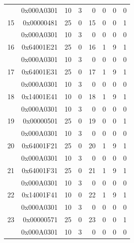 \begin{longtable}{r r r r r r r r}
  & 0x000A0301 & 10 & 3 & 0 & 0 & 0 & 0 \\
15 & 0x00000481 & 25 & 0 & 15 & 0 & 0 & 1 \\
  & 0x000A0301 & 10 & 3 & 0 & 0 & 0 & 0 \\
16 & 0x64001E21 & 25 & 0 & 16 & 1 & 9 & 1 \\
  & 0x000A0301 & 10 & 3 & 0 & 0 & 0 & 0 \\
17 & 0x64001E31 & 25 & 0 & 17 & 1 & 9 & 1 \\
  & 0x000A0301 & 10 & 3 & 0 & 0 & 0 & 0 \\
18 & 0x14001E41 & 10 & 0 & 18 & 1 & 9 & 1 \\
  & 0x000A0301 & 10 & 3 & 0 & 0 & 0 & 0 \\
19 & 0x00000501 & 25 & 0 & 19 & 0 & 0 & 1 \\
  & 0x000A0301 & 10 & 3 & 0 & 0 & 0 & 0 \\
20 & 0x64001F21 & 25 & 0 & 20 & 1 & 9 & 1 \\
  & 0x000A0301 & 10 & 3 & 0 & 0 & 0 & 0 \\
21 & 0x64001F31 & 25 & 0 & 21 & 1 & 9 & 1 \\
  & 0x000A0301 & 10 & 3 & 0 & 0 & 0 & 0 \\
22 & 0x14001F41 & 10 & 0 & 22 & 1 & 9 & 1 \\
  & 0x000A0301 & 10 & 3 & 0 & 0 & 0 & 0 \\
23 & 0x00000571 & 25 & 0 & 23 & 0 & 0 & 1 \\
  & 0x000A0301 & 10 & 3 & 0 & 0 & 0 & 0 \\


\end{longtable}
